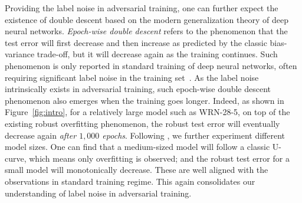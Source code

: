 Providing the label noise in adversarial training, one can further expect the existence of double descent based on the modern generalization theory of deep neural networks.
\emph{Epoch-wise double descent} refers to the phenomenon that the test error will first decrease and then increase as predicted by the classic bias-variance trade-off, but it will decrease again as the training continues. Such phenomenon is only reported in standard training of deep neural networks, often requiring significant label noise in the training set~\citep{Nakkiran2020DeepDD}.
As the label noise intrinsically exists in adversarial training, such epoch-wise double descent phenomenon also emerges when the training goes longer.
Indeed, as shown in Figure~\ref{fig:intro}, for a relatively large model such as WRN-28-5, on top of the existing robust overfitting phenomenon, the robust test error will eventually decrease again \emph{after $1,000$ epochs}. Following \cite{Nakkiran2020DeepDD}, we further experiment different model sizes. One can find that a medium-sized model will follow a classic U-curve, which means only overfitting is observed; and the robust test error for a small model will monotonically decrease. These are well aligned with the observations in standard training regime.
This again consolidates our understanding of label noise in adversarial training.



